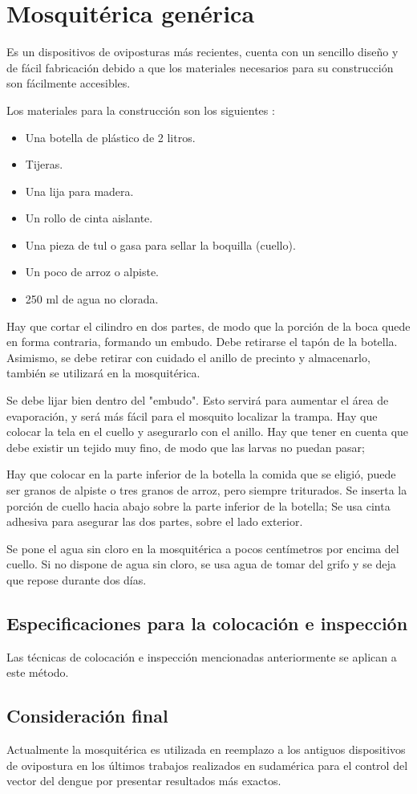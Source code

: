 \section{Mosquitérica genérica}
Es un dispositivos de oviposturas más recientes, cuenta con un sencillo
diseño y de fácil fabricación debido a que los materiales necesarios para
su construcción son fácilmente accesibles.

Los materiales para la construcción son los siguientes :
\begin{itemize}
    \item Una botella de plástico de 2 litros.
    \item Tijeras.
    \item Una lija para madera.
    \item Un rollo de cinta aislante.
    \item Una pieza de tul o gasa para sellar la boquilla (cuello).
    \item Un poco de arroz o alpiste.
    \item 250 ml de agua no clorada.
\end{itemize}

Hay que cortar el cilindro en dos partes, de modo que la porción de la
boca quede en forma contraria, formando un embudo. Debe retirarse el tapón
de la botella. Asimismo, se debe retirar con cuidado el anillo de precinto
y almacenarlo, también se utilizará en la mosquitérica.

Se debe lijar bien dentro del "embudo". Esto servirá para aumentar el área
de evaporación, y será más fácil para el mosquito localizar la  trampa.
Hay que colocar la  tela en el cuello y asegurarlo con el anillo. Hay que
tener en cuenta que debe existir un tejido muy fino, de modo que las larvas
no puedan pasar;


Hay que colocar en la parte inferior de la botella la comida que se eligió,
puede ser granos de alpiste o tres granos de arroz, pero siempre triturados.
Se inserta la porción de cuello hacia abajo sobre la parte inferior de la
botella; Se usa cinta adhesiva para asegurar las dos partes, sobre el lado
exterior.

Se pone el agua sin cloro en la mosquitérica a pocos centímetros por encima
del cuello. Si no dispone de agua sin cloro, se usa agua de tomar del grifo
y se deja que repose durante dos días.


\subsection{Especificaciones para la colocación e inspección}
Las técnicas de colocación e inspección mencionadas anteriormente se aplican
a este método.

\subsection{Consideración final}
Actualmente la mosquitérica es utilizada en reemplazo a los antiguos
dispositivos de ovipostura en los últimos trabajos realizados en sudamérica
para el control del vector del dengue por presentar resultados más exactos.
